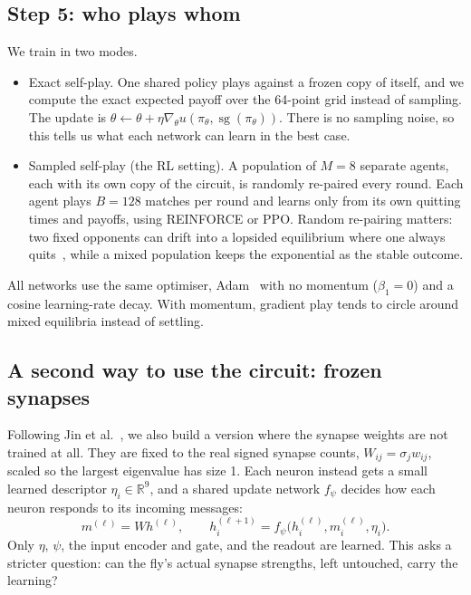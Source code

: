 \documentclass{article}
\newcommand{\R}{\mathbb{R}}
\newcommand{\sg}{\operatorname{sg}}
\begin{document}
\subsection{Step 5: who plays whom}

We train in two modes.
\begin{itemize}
  \item Exact self-play. One shared policy plays against a frozen copy of itself, and we compute the exact expected payoff over the 64-point grid instead of sampling. The update is $\theta \leftarrow \theta + \eta \nabla_\theta u(\pi_\theta, \sg(\pi_\theta))$. There is no sampling noise, so this tells us what each network can learn in the best case.
  \item Sampled self-play (the RL setting). A population of $M = 8$ separate agents, each with its own copy of the circuit, is randomly re-paired every round. Each agent plays $B = 128$ matches per round and learns only from its own quitting times and payoffs, using REINFORCE or PPO. Random re-pairing matters: two fixed opponents can drift into a lopsided equilibrium where one always quits~\cite{selten1980}, while a mixed population keeps the exponential as the stable outcome.
\end{itemize}
All networks use the same optimiser, Adam~\cite{kingma2015} with no momentum ($\beta_1 = 0$) and a cosine learning-rate decay. With momentum, gradient play tends to circle around mixed equilibria instead of settling.

\subsection{A second way to use the circuit: frozen synapses}

Following Jin et al.~\cite{jin2026}, we also build a version where the synapse weights are not trained at all. They are fixed to the real signed synapse counts, $W_{ij} = \sigma_j w_{ij}$, scaled so the largest eigenvalue has size 1. Each neuron instead gets a small learned descriptor $\eta_i \in \R^9$, and a shared update network $f_\psi$ decides how each neuron responds to its incoming messages:
\[
m^{(\ell)} = W h^{(\ell)}, \qquad h_i^{(\ell+1)} = f_\psi\big(h_i^{(\ell)}, m_i^{(\ell)}, \eta_i\big).
\]
Only $\eta$, $\psi$, the input encoder and gate, and the readout are learned. This asks a stricter question: can the fly's actual synapse strengths, left untouched, carry the learning?
\end{document}
